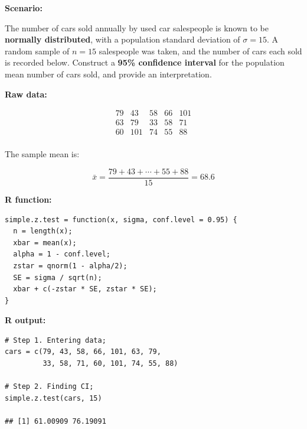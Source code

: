\vspace{1em}

\noindent\textbf{Scenario:}

\vspace{0.5em}

The number of cars sold annually by used car salespeople is known to be \textbf{normally distributed}, with a population standard deviation of $\sigma = 15$. A random sample of $n = 15$ salespeople was taken, and the number of cars each sold is recorded below. Construct a \textbf{95\% confidence interval} for the population mean number of cars sold, and provide an interpretation.

\vspace{1em}

\noindent\textbf{Raw data:}

\[
\begin{matrix}
79 & 43 & 58 & 66 & 101 \\
63 & 79 & 33 & 58 & 71 \\
60 & 101 & 74 & 55 & 88 \\
\end{matrix}
\]

\vspace{0.5em}

\noindent The sample mean is:

\[
\bar{x} = \frac{79 + 43 + \cdots + 55 + 88}{15} = 68.6
\]

\vspace{1em}

\noindent\textbf{R function:}

\begin{tcolorbox}[colback=gray!10, colframe=gray!50, arc=2mm]
\begin{verbatim}
simple.z.test = function(x, sigma, conf.level = 0.95) {
  n = length(x);
  xbar = mean(x);
  alpha = 1 - conf.level;
  zstar = qnorm(1 - alpha/2);
  SE = sigma / sqrt(n);
  xbar + c(-zstar * SE, zstar * SE);
}
\end{verbatim}
\end{tcolorbox}

\vspace{0.5em}

\noindent\textbf{R output:}

\begin{tcolorbox}[colback=gray!10, colframe=gray!50, arc=2mm]
\begin{verbatim}
# Step 1. Entering data;
cars = c(79, 43, 58, 66, 101, 63, 79,
         33, 58, 71, 60, 101, 74, 55, 88)

# Step 2. Finding CI;
simple.z.test(cars, 15)

## [1] 61.00909 76.19091
\end{verbatim}
\end{tcolorbox}

